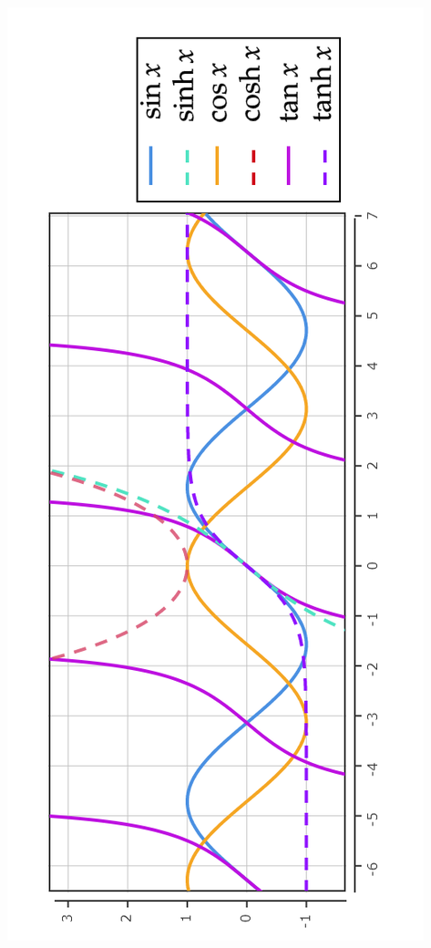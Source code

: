 \documentclass[7pt,landscape, margin = 0.1mm]{article}
\begin{document}
\begin{multicols}{4}
\begin{flushleft}
\includegraphics[scale=0.4]{build/pictures/dg1.png} 

\vspace{1mm} \hline \vspace{1 mm}




\end{flushleft}
\end{multicols}
\end{document}
